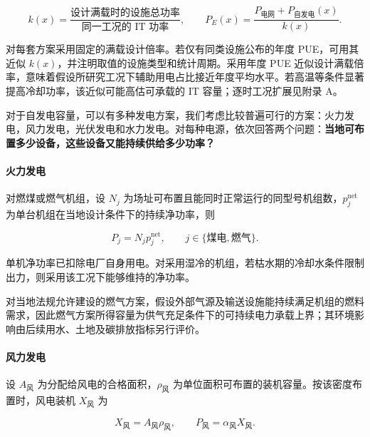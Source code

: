 \begin{equation}\label{eq:q1-k}
k(x)=\frac{\text{设计满载时的设施总功率}}{\text{同一工况的 IT 功率}},
\qquad
P_E(x)=\frac{P_{\text{电网}}+P_{\text{自发电}}(x)}{k(x)}.
\end{equation}

\begin{noteblock}
对每套方案采用固定的满载设计倍率。若仅有同类设施公布的年度 PUE，可用其近似 $k(x)$，并注明取值的设施类型和统计周期。采用年度 PUE 近似设计满载倍率，意味着假设所研究工况下辅助用电占比接近年度平均水平。若高温等条件显著提高冷却功率，该近似可能高估可承载的 IT 容量；逐时工况扩展见附录 A。
\end{noteblock}

对于自发电容量，可以有多种发电方案，我们考虑比较普遍可行的方案：火力发电，风力发电，光伏发电和水力发电。对每种电源，依次回答两个问题：\textbf{当地可布置多少设备，这些设备又能持续供给多少功率？}

\paragraph{火力发电}\label{sec:thermal}

对燃煤或燃气机组，设 $N_j$ 为场址可布置且能同时正常运行的同型号机组数，$p_j^{\mathrm{net}}$ 为单台机组在当地设计条件下的持续净功率，则

\begin{equation}\label{eq:q1-thermal}
P_j=N_jp_j^{\mathrm{net}}, \qquad j\in\{\text{煤电},\text{燃气}\}.
\end{equation}

单机净功率已扣除电厂自身用电。对采用湿冷的机组，若枯水期的冷却水条件限制出力，则采用该工况下能够维持的净功率\cite{q1ref02}。

\begin{asum}[燃气等燃料条件充足]\label{asum:gas}
对当地法规允许建设的燃气方案，假设外部气源及输送设施能持续满足机组的燃料需求，因此燃气方案所得容量为供气充足条件下的可持续电力承载上界；其环境影响由后续用水、土地及碳排放指标另行评价。
\end{asum}

\paragraph{风力发电}\label{sec:wind}

设 $A_{\text{风}}$ 为分配给风电的合格面积，$\rho_{\text{风}}$ 为单位面积可布置的装机容量。按该密度布置时，风电装机 $X_{\text{风}}$ 为

\begin{equation}\label{eq:q1-wind}
X_{\text{风}}=A_{\text{风}}\rho_{\text{风}}, \qquad P_{\text{风}}=\alpha_{\text{风}}X_{\text{风}}.
\end{equation}

